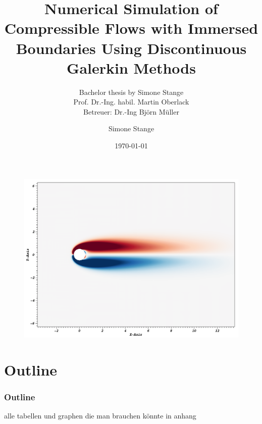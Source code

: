 \documentclass[accentcolor=tud7b,colorbacktitle,inverttitle,landscape,presentation,t]{tudbeamer}
\begin{document}
\title{Numerical Simulation of Compressible Flows with Immersed Boundaries Using Discontinuous Galerkin Methods}
\subtitle{Bachelor thesis by Simone Stange\\Prof. Dr.-Ing. habil. Martin Oberlack\\Betreuer: Dr.-Ing Björn Müller}

\author[Simone Stange]{Simone Stange}


\date{\today}

\begin{titleframe}
	\begin{figure}[htbp] 
	    \centering
		\includegraphics[height=0.38\textwidth]{img/Re40DG3CpD60} 
	\end{figure}
\end{titleframe}

\section*{Outline}
\begin{frame}
	\frametitle{Outline}
	\tableofcontents
\end{frame}




	
\appendix
		\begin{frame}
			alle tabellen und graphen die man brauchen könnte in anhang
		\end{frame}		
\begin{frame}

\end{frame}
\end{document}
